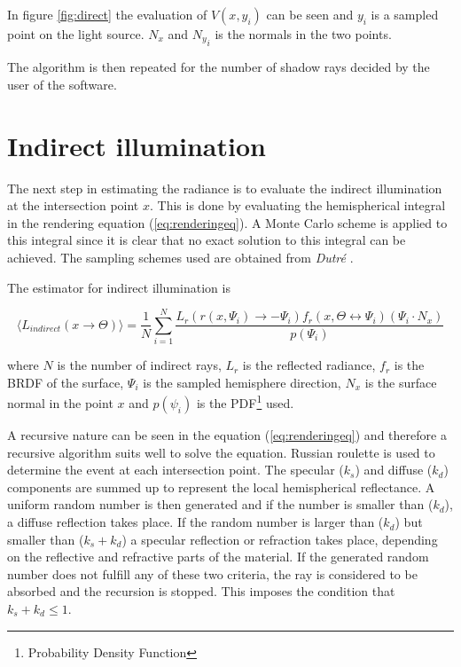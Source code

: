 \documentclass[a4paper]{report}
\begin{document}
In figure \ref{fig:direct} the evaluation of \(V(x,y_i)\) can be seen
and \(y_i\) is a sampled point on the light source. \(N_x\) and
\({N_y}_i\) is the normals in the two points.

The algorithm is then repeated for the number of shadow rays decided
by the user of the software.

\section{Indirect illumination}

The next step in estimating the radiance is to evaluate the indirect
illumination at the intersection point \(x\). This is done by
evaluating the hemispherical integral in the rendering equation
(\ref{eq:renderingeq}). A Monte Carlo scheme is applied to this
integral since it is clear that no exact solution to this integral can
be achieved. The sampling schemes used are obtained from \emph{Dutré} \cite{globalcomp}. 

The estimator for indirect illumination is

\begin{equation}
  \langle L_{indirect}(x \to \Theta) \rangle = \frac{1}{N}\sum^N_{i=1}
  \frac{L_r(r(x,\Psi_i) \to -\Psi_i)f_r(x,\Theta \leftrightarrow
    \Psi_i)(\Psi_i \cdot N_x)}{p(\Psi_i)}
  \label{eq:indirest}
\end{equation}

where \(N\) is the number of indirect rays, \(L_r\) is the reflected
radiance, \(f_r\) is the BRDF of the surface, \(\Psi_i\) is the
sampled hemisphere direction, \(N_x\) is the surface normal in the
point \(x\) and \(p(\psi_i)\) is the PDF\footnote{Probability Density
Function} used.

A recursive nature can be seen in the equation (\ref{eq:renderingeq})
and therefore a recursive algorithm suits well to solve the
equation. Russian roulette is used to determine the event at each
intersection point. The specular (\(k_s\)) and diffuse (\(k_d\)) components are summed up
to represent the local hemispherical reflectance. A uniform random
number is then generated and if the number is smaller than (\(k_d\)), a
diffuse reflection takes place. If the random number is larger than
 (\(k_d\)) but smaller than (\(k_s+k_d\)) a specular reflection or
 refraction takes place, depending on the reflective and refractive
 parts of the material. If the generated random number does not
 fulfill any of these two criteria, the ray is considered to be
 absorbed and the recursion is stopped. This imposes the condition
 that \(k_s+k_d \leq 1\). 
\end{document}
